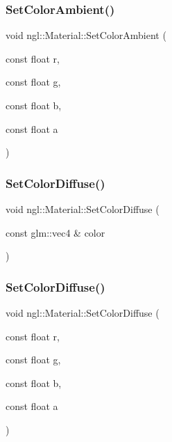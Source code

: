 \subsubsection{\texorpdfstring{Set\+Color\+Ambient()}{SetColorAmbient()}\hspace{0.1cm}{\footnotesize\ttfamily [2/2]}}
{\footnotesize\ttfamily void ngl\+::\+Material\+::\+Set\+Color\+Ambient (\begin{DoxyParamCaption}\item[{const float}]{r,  }\item[{const float}]{g,  }\item[{const float}]{b,  }\item[{const float}]{a }\end{DoxyParamCaption})}

\mbox{\label{classngl_1_1_material_a8086acfca809cb74fee5cef4348e6f97}} 
\subsubsection{\texorpdfstring{Set\+Color\+Diffuse()}{SetColorDiffuse()}\hspace{0.1cm}{\footnotesize\ttfamily [1/2]}}
{\footnotesize\ttfamily void ngl\+::\+Material\+::\+Set\+Color\+Diffuse (\begin{DoxyParamCaption}\item[{const glm\+::vec4 \&}]{color }\end{DoxyParamCaption})}

\mbox{\label{classngl_1_1_material_aa0fbefc39b5a90677aef7b13362687d0}} 
\subsubsection{\texorpdfstring{Set\+Color\+Diffuse()}{SetColorDiffuse()}\hspace{0.1cm}{\footnotesize\ttfamily [2/2]}}
{\footnotesize\ttfamily void ngl\+::\+Material\+::\+Set\+Color\+Diffuse (\begin{DoxyParamCaption}\item[{const float}]{r,  }\item[{const float}]{g,  }\item[{const float}]{b,  }\item[{const float}]{a }\end{DoxyParamCaption})}

